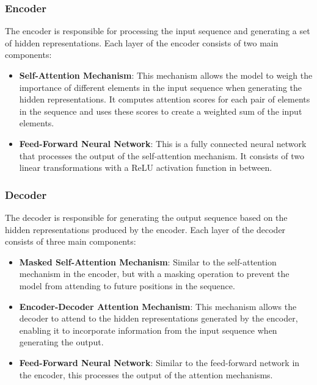 \documentclass[12pt]{article}
\begin{document}
\subsubsection{Encoder}
The encoder is responsible for processing the input sequence and generating a set of hidden representations. Each layer of the encoder consists of two main components:
\begin{itemize}
    \item \textbf{Self-Attention Mechanism}: This mechanism allows the model to weigh the importance of different elements in the input sequence when generating the hidden representations. It computes attention scores for each pair of elements in the sequence and uses these scores to create a weighted sum of the input elements.
    \item \textbf{Feed-Forward Neural Network}: This is a fully connected neural network that processes the output of the self-attention mechanism. It consists of two linear transformations with a ReLU activation function in between.
\end{itemize}

\subsubsection{Decoder}
The decoder is responsible for generating the output sequence based on the hidden representations produced by the encoder. Each layer of the decoder consists of three main components:
\begin{itemize}
    \item \textbf{Masked Self-Attention Mechanism}: Similar to the self-attention mechanism in the encoder, but with a masking operation to prevent the model from attending to future positions in the sequence.
    \item \textbf{Encoder-Decoder Attention Mechanism}: This mechanism allows the decoder to attend to the hidden representations generated by the encoder, enabling it to incorporate information from the input sequence when generating the output.
    \item \textbf{Feed-Forward Neural Network}: Similar to the feed-forward network in the encoder, this processes the output of the attention mechanisms.
\end{itemize}
\end{document}
